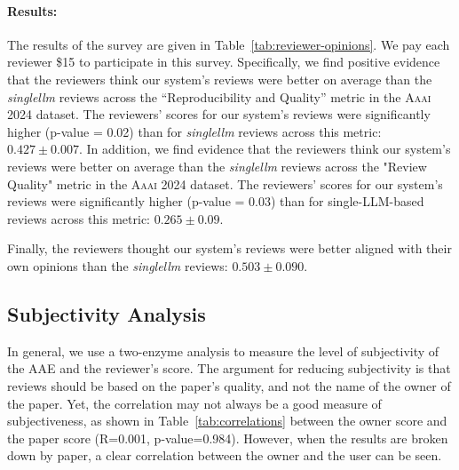 \documentclass{article} %
\begin{document}
\paragraph{Results:}
The results of the survey are given in Table~\ref{tab:reviewer-opinions}. We pay each reviewer \$15 to participate in this survey. 
Specifically, we find positive evidence that the reviewers think our system's reviews were better on average than the \textit{singlellm} reviews across the ``Reproducibility and Quality'' metric in the \textsc{Aaai 2024} dataset. The reviewers' scores for our system's reviews were significantly higher (p-value = 0.02) than for \textit{singlellm} reviews across this metric: $0.427 \pm 0.007$. 
In addition, we find evidence that the reviewers think our system's reviews were better on average than the \textit{singlellm} reviews across the "Review Quality" metric in the \textsc{Aaai 2024} dataset. The reviewers' scores for our system's reviews were significantly higher (p-value = 0.03) than for single-LLM-based reviews across this metric: $0.265 \pm 0.09$.

Finally, the reviewers thought our system's reviews were better aligned with their own opinions than the \textit{singlellm} reviews: $0.503 \pm 0.090$. 
\subsection{Subjectivity Analysis}
In general, we use a two-enzyme analysis to measure the level of subjectivity of the AAE and the reviewer's score. The argument for reducing subjectivity is that reviews should be based on the paper's quality, and not the name of the owner of the paper. Yet, the correlation may not always be a good measure of subjectiveness, as shown in Table~\ref{tab:correlations} between the owner score and the paper score (R=0.001, p-value=0.984). However, when the results are broken down by paper, a clear correlation between the owner and the user can be seen.
\end{document}
